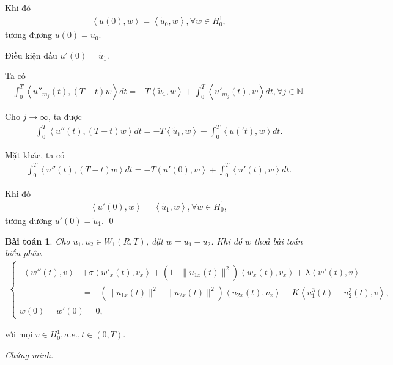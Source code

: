 \documentclass[12pt,a4paper]{article}
\def\N{\mathbb{N}}
\newtheorem{theorem}{Bài toán}[section]
\theoremstyle{definition}
\begin{document}
Khi đó
\begin{align*}
    \left<u(0),w\right> = \left<\tilde{u}_0,w\right>, \forall w \in H^1_0,
\end{align*}
tương đương $u(0) = \tilde{u}_0$.

Điều kiện đầu $u'(0) = \tilde{u}_1$.

Ta có
\begin{align*}
    \int_0^T \left<u''_{m_j}(t), (T-t)w\right> dt = -T\left<\tilde{u}_1,w\right> + \int_0^T \left<u'_{m_j}(t),w\right>dt, \forall j \in \N.
\end{align*}

Cho $j \to \infty$, ta được
\begin{align*}
    \int_0^T \left<u''(t), (T-t)w\right>dt = -T\left<\tilde{u}_1,w\right> + \int_0^T \left<u('t),w\right>dt.
\end{align*}

Mặt khác, ta có
\begin{align*}
    \int_0^T \left<u''(t), (T-t)w\right>dt = -T\left(u'(0),w\right> + \int_0^T \left<u'(t),w\right>dt.
\end{align*}

Khi đó
\begin{align*}
    \left<u'(0),w\right> = \left<\tilde{u}_1,w\right>, \forall w \in H^1_0,
\end{align*}
tương đương $u'(0) = \tilde{u}_1$. \qed

\begin{theorem}
    Cho $u_1, u_2 \in W_1(R,T)$, đặt $w = u_1 - u_2$. Khi đó $w$ thoả bài toán biến phân
    \begin{align*}
    \begin{cases}
        \begin{aligned}
            \left<w''(t),v\right> &+ \sigma \left<w'_x(t),v_x\right> + \left(1 + \|u_{1x}(t)\|^2\right) \left<w_x(t),v_x\right> + \lambda \left<w'(t),v\right> \\
            &= - \left(\|u_{1x}(t)\|^2 - \|u_{2x}(t)\|^2\right) \left<u_{2x}(t),v_x\right> - K\left<u^3_1(t) - u^3_2(t),v\right>,
        \end{aligned}\\
        w(0) = w'(0) = 0,
    \end{cases}
    \end{align*}
\end{theorem}
với mọi $v \in H^1_0, a.e., t \in (0,T)$.

\textit{Chứng minh.}
\end{document}
